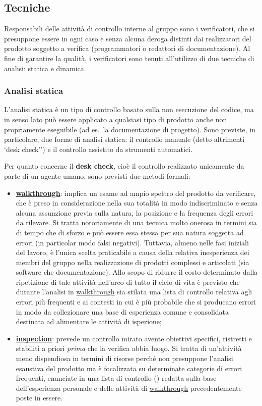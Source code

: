 \subsection{Tecniche}
Responsabili delle attività di controllo interne al gruppo sono i verificatori, che si presuppone essere in ogni caso e senza alcuna deroga distinti dai realizzatori del prodotto soggetto a verifica (programmatori o redattori di documentazione). Al fine di garantire la qualità, i verificatori sono tenuti all'utilizzo di due tecniche di analisi: statica e dinamica.

\subsubsection{Analisi statica}
L'analisi statica è un tipo di controllo basato sulla non esecuzione del codice, ma in senso lato può essere applicato a qualsiasi tipo di prodotto anche non propriamente eseguibile (ad es.~la documentazione di progetto). Sono previste, in particolare, due forme di analisi statica: il controllo manuale (detto altrimenti `desk check'') e il controllo assistito da strumenti automatici.

Per quanto concerne il \textbf{desk check}, cioè il controllo realizzato unicamente da parte di un agente umano, sono previsti due metodi formali:
\begin{itemize}
  \item \textbf{\underline{walkthrough}}: implica un esame ad ampio spettro del prodotto da verificare, che è preso in considerazione nella sua totalità in modo indiscriminato e senza alcuna assunzione previa sulla natura, la posizione e la frequenza degli errori da rilevare. Si tratta notoriamente di una tecnica molto onerosa in termini sia di tempo che di sforzo e può essere essa stessa per sua natura soggetta ad errori (in particolar modo falsi negativi). Tuttavia, almeno nelle fasi iniziali del lavoro, è l'unica scelta praticabile a causa della relativa inesperienza dei membri del gruppo nella realizzazione di prodotti complessi e articolati (sia software che documentazione). Allo scopo di ridurre il costo determinato dalla ripetizione di tale attività nell'arco di tutto il ciclo di vita è previsto che durante l'analisi in \underline{walkthrough} sia stilata una lista di controllo relativa agli errori più frequenti e ai contesti in cui è più probabile che si producano errori in modo da collezionare una base di esperienza comune e consolidata destinata ad alimentare le attività di ispezione;
  \item \textbf{\underline{inspection}}: prevede un controllo mirato avente obiettivi specifici, ristretti e stabiliti a priori \emph{prima} che la verifica abbia luogo. Si tratta di un'attività meno dispendiosa in termini di risorse perché non presuppone l'analisi esaustiva del prodotto ma è focalizzata su determinate categorie di errori frequenti, enunciate in una lista di controllo () redatta sulla base dell'esperienza personale e delle attività di \underline{walkthrough} precedentemente poste in essere.
\end{itemize}

